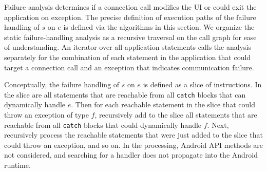 Failure analysis determines if a connection call modifies the UI or
could exit the application on exception.  The precise definition of
execution paths of the failure handling of $s$ on $e$ is defined via
the algorithms in this section. We organize the static
failure-handling analysis as a recursive traversal on the call graph
for ease of understanding.  An iterator over all application
statements calls the analysis separately for the combination of each
statement in the application that could target a connection call and
an exception that indicates communication failure.

Conceptually, the failure handling of $s$ on $e$ is defined as a slice
of instructions.  In the slice are all statements that are reachable
from all \lstinline!catch! blocks that can dynamically handle $e$.
Then for each reachable statement in the slice that could throw an
exception of type $f$, recursively add to the slice all statements
that are reachable from all \lstinline!catch! blocks that could
dynamically handle $f$.  Next, recursively process the reachable
statements that were just added to the slice that could throw an
exception, and so on.  In the processing, Android API methods are not
considered, and searching for a handler does not propagate into the
Android runtime.

